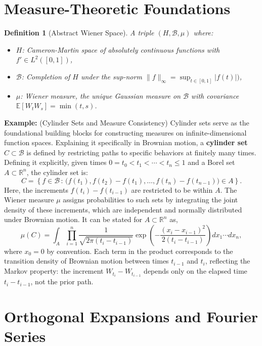 \documentclass[12pt]{report}
\newtheorem{definition}[theorem]{Definition}
\begin{document}
\section{Measure-Theoretic Foundations}
\begin{definition}[Abstract Wiener Space]
A triple \((H, \mathcal{B}, \mu)\) where:
\begin{itemize}
    \item \(H\): Cameron-Martin space of absolutely continuous functions with \(f' \in L^2([0,1])\),
    \item \(\mathcal{B}\): Completion of \(H\) under the sup-norm \(\|f\|_\infty = \sup_{t \in [0,1]} |f(t)|)\),
    \item \(\mu\): Wiener measure, the unique Gaussian measure on \(\mathcal{B}\) with covariance \(\mathbb{E}[W_t W_s] = \min(t,s)\).
\end{itemize}
\end{definition}
\noindent
\textbf{Example:} (Cylinder Sets and Measure Consistency)
Cylinder sets serve as the foundational building blocks for constructing measures on infinite-dimensional function spaces. Explaining it specifically in Brownian motion, a \textbf{cylinder set} \(C \subset \mathcal{B}\) is defined by restricting paths to specific behaviors at finitely many times. Defining it explicitly, given times \(0 = t_0 < t_1 < \cdots < t_n \leq 1\) and a Borel set \(A \subset \mathbb{R}^n\), the cylinder set is:  
\[
C = \left\{ f \in \mathcal{B} \,:\, \big(f(t_1), f(t_2) - f(t_1), \ldots, f(t_n) - f(t_{n-1})\big) \in A \right\}.
\]
Here, the increments \(f(t_i) - f(t_{i-1})\) are restricted to be within \(A\). The Wiener measure \(\mu\) assigns probabilities to such sets by integrating the joint density of these increments, which are independent and normally distributed under Brownian motion. It can be stated for \(A \subset \mathbb{R}^n\) as,  
\[
\mu(C) = \int_A \prod_{i=1}^n \frac{1}{\sqrt{2\pi(t_i - t_{i-1})}} \exp\left(-\frac{(x_i - x_{i-1})^2}{2(t_i - t_{i-1})}\right) dx_1 \cdots dx_n,
\]  
where \(x_0 = 0\) by convention. Each term in the product corresponds to the transition density of Brownian motion between times \(t_{i-1}\) and \(t_i\), reflecting the Markov property: the increment \(W_{t_i} - W_{t_{i-1}}\) depends only on the elapsed time \(t_i - t_{i-1}\), not the prior path.

\section{Orthogonal Expansions and Fourier Series}
\end{document}
